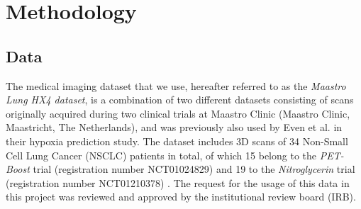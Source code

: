 \chapter{Methodology}
\label{Methodology}



\section{Data}
The medical imaging dataset that we use, hereafter referred to as the \textit{Maastro Lung HX4 dataset}, is a combination of two different datasets consisting of scans originally acquired during two clinical trials at Maastro Clinic (Maastro Clinic, Maastricht, The Netherlands), and was previously also used by Even et al. \cite{even2017predicting} in their hypoxia prediction study. The dataset includes 3D scans of 34 Non-Small Cell Lung Cancer (NSCLC) patients in total, of which 15 belong to the \textit{PET-Boost} trial (registration number NCT01024829) \cite{van2012pet} and 19 to the \textit{Nitroglycerin} trial (registration number NCT01210378) \cite{even2017predicting}. The request for the usage of this data in this project was reviewed and approved by the institutional review board (IRB).


